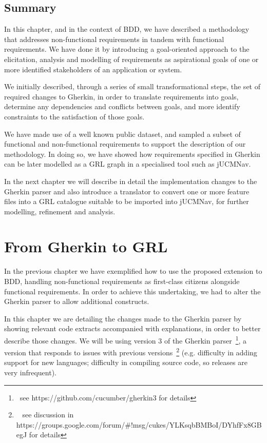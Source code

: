 \documentclass[dissertation,final]{softeng}
\newcommand{\nfrs}{non-functional requirements\xspace}
\begin{document}
\section{Summary}
In this chapter, and in the context of BDD, we have described a methodology that addresses \nfrs in tandem with functional requirements. We have done it by introducing a goal-oriented approach to the elicitation, analysis and modelling of requirements as aspirational goals of one or more identified stakeholders of an application or system.

We initially described, through a series of small transformational steps, the set of required changes to Gherkin, in order to translate requirements into goals, determine any dependencies and conflicts between goals, and more identify constraints to the satisfaction of those goals.

We have made use of a well known public dataset, and sampled a subset of functional and non-functional requirements to support the description of our methodology. In doing so, we have showed how requirements specified in Gherkin can be later modelled as a GRL graph in a specialised tool such as jUCMNav.

In the next chapter we will describe in detail the implementation changes to the Gherkin parser and also introduce a translator to convert one or more feature files into a GRL catalogue suitable to be imported into jUCMNav, for further modelling, refinement and analysis.

\chapter{From Gherkin to GRL}
\label{ch:gherkin_redux}
In the previous chapter we have exemplified how to use the proposed extension to BDD, handling \nfrs as first-class citizens alongside functional requirements. In order to achieve this undertaking, we had to alter the Gherkin parser to allow additional constructs.

In this chapter we are detailing the changes made to the Gherkin parser by showing relevant code extracts accompanied with explanations, in order to better describe those changes. We will be using version 3 of the Gherkin parser~\footnote{~see https://github.com/cucumber/gherkin3 for details}, a version that responds to issues with previous versions~\footnote{~ see discussion in https://groups.google.com/forum/\#!msg/cukes/YLKsqbBMBoI/DYhfFx8GBegJ for details} (e.g. difficulty in adding support for new languages; difficulty in compiling source code, so releases are very infrequent).
\end{document}
